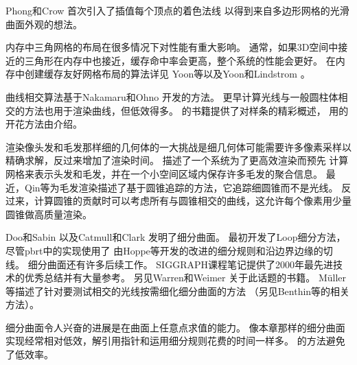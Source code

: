 Phong和Crow \parencite*{phong1975improved}首次引入了插值每个顶点的着色法线
以得到来自多边形网格的光滑曲面外观的想法。

内存中三角网格的布局在很多情况下对性能有重大影响。
通常，如果3D空间中接近的三角形在内存中也接近，缓存命中率会更高，整个系统的性能会更好。
在内存中创建缓存友好网格布局的算法详见
Yoon等\parencite*{10.1145/1186822.1073278}以及Yoon和Lindstrom \parencite*{4015484}。

曲线相交算法基于Nakamaru和Ohno \parencite*{Nakamaru_raytracing}开发的方法。
更早计算光线与一般圆柱体相交的方法也用于渲染曲线，但低效得多\citep{10.1145/6116.6118,DeVoogt2000197}。
\citet{10.5555/501891}的书籍提供了对样条的精彩概述，
用的开花方法由\citet{ramshaw1987blossoming}介绍。

渲染像头发和毛发那样细的几何体的一大挑战是细几何体可能需要许多像素采样以精确求解，反过来增加了渲染时间。
\citet{10.1145/1179849.1179904}描述了一个系统为了更高效渲染而预先
计算网格来表示头发和毛发，并在一个小空间区域内保存许多毛发的聚合信息。
最近，Qin等\parencite*{6684531}为毛发渲染描述了基于圆锥追踪的方法，它追踪细圆锥而不是光线。
反过来，计算圆锥的贡献时可以考虑所有与圆锥相交的曲线，这允许每个像素用少量圆锥做高质量渲染。

Doo和Sabin \parencite*{DOO1978356}以及Catmull和Clark \parencite*{CATMULL1978350}发明了细分曲面。
\citet{loop1987smooth}最初开发了Loop细分方法，尽管pbrt中的实现使用了
由Hoppe等\parencite*{10.1145/192161.192233}开发的改进的细分规则和沿边界边缘的切线。
细分曲面还有许多后续工作。
SIGGRAPH课程笔记提供了2000年最先进技术的优秀总结并有大量参考\citep{zorin2000subdivision}。
另见Warren和Weimer \parencite*{WARREN20021}关于此话题的书籍。
Müller等\parencite*{10.1111/1467-8659.t01-2-00703}描述了针对要测试相交的光线按需细化细分曲面的方法
（另见Benthin等\parencite*{SCI:Ben2007a}的相关方法）。

细分曲面令人兴奋的进展是在曲面上任意点求值的能力\citep{10.1145/280814.280945}。
像本章那样的细分曲面实现经常相对低效，解引用指针和运用细分规则花费的时间一样多。
\citeauthor{10.1145/280814.280945}的方法避免了低效率。